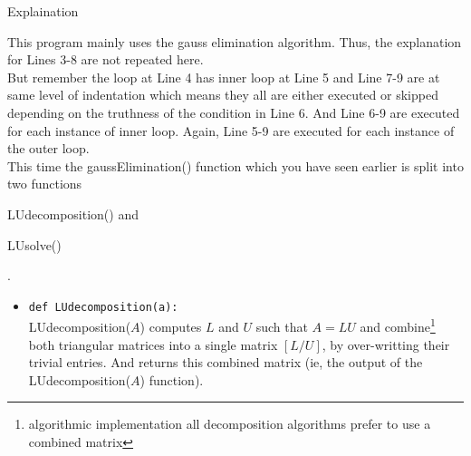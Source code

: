 \begin{remark}Explaination
\begin{commentary}
	This program mainly uses the gauss elimination algorithm. Thus, the explanation for Lines 3-8 are not repeated here.\\

	But remember the loop at Line 4 has inner loop at Line 5 and Line 7-9 are at same level of indentation which means they all are either executed or skipped depending on the truthness of the condition in Line 6. And Line 6-9 are executed for each instance of inner loop. Again, Line 5-9 are executed for each instance of the outer loop.\\

This time the gaussElimination() function which you have seen earlier is split into two functions \begin{enumerate*} \item LUdecomposition() and \item LUsolve() \end{enumerate*}.
\begin{itemize}
	\item \texttt{def LUdecomposition(a):} \\ LUdecomposition($A$) computes $L$ and $U$ such that $A = LU$ and combine\footnote{algorithmic implementation all decomposition algorithms prefer to use a combined matrix} both triangular matrices into a single matrix $[L/U]$, by over-writting their trivial entries. And returns this combined matrix (ie, the output of the LUdecomposition($A$) function).\\
		

\end{itemize}
\end{commentary}
\end{remark}

